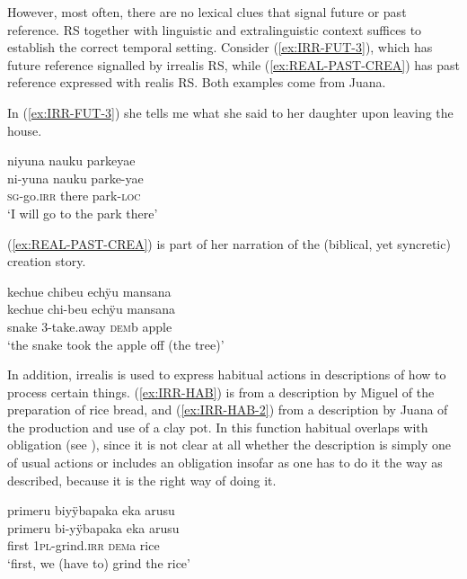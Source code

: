 However, most often, there are no lexical clues that signal future or past reference. RS together with linguistic and extralinguistic context suffices to establish the correct temporal setting. Consider (\ref{ex:IRR-FUT-3}), which has future reference signalled by irrealis RS, while (\ref{ex:REAL-PAST-CREA}) has past reference expressed with realis RS. Both examples come from Juana.

\newpage
In (\ref{ex:IRR-FUT-3}) she tells me what she said to her daughter upon leaving the house.

\ea\label{ex:IRR-FUT-3}
\begingl 
\glpreamble niyuna nauku parkeyae\\
\gla ni-yuna nauku parke-yae\\ 
\textsc{sg}-go.\textsc{irr} there park-\textsc{loc}\\ 
\glft ‘I will go to the park there’
 \trailingcitation{[jxx-p120430l-2.242]}
\xe
{}

(\ref{ex:REAL-PAST-CREA}) is part of her narration of the (biblical, yet syncretic) creation story.

\ea\label{ex:REAL-PAST-CREA}
\begingl 
\glpreamble kechue chibeu echÿu mansana\\
\gla kechue chi-beu echÿu mansana\\ 
\glb snake 3-take.away \textsc{dem}b apple\\ 
\glft ‘the snake took the apple off (the tree)’
 \trailingcitation{[jxx-n101013s-1.410]}
\xe

In addition, irrealis is used to express habitual actions in descriptions of how to process certain things. (\ref{ex:IRR-HAB}) is from a description by Miguel of the preparation of rice bread, and (\ref{ex:IRR-HAB-2}) from a description by Juana of the production and use of a clay pot. In this function habitual overlaps with obligation (see ), since it is not clear at all whether the description is simply one of usual actions or includes an obligation insofar as one has to do it the way as described, because it is the right way of doing it.

\ea\label{ex:IRR-HAB}
\begingl 
\glpreamble primeru biyÿbapaka eka arusu\\
\gla primeru bi-yÿbapaka eka arusu\\ 
\glb first 1\textsc{pl}-grind.\textsc{irr} \textsc{dem}a rice\\ 
\glft ‘first, we (have to) grind the rice’
 \trailingcitation{[mxx-d120411ls-1a.018]}
\xe

